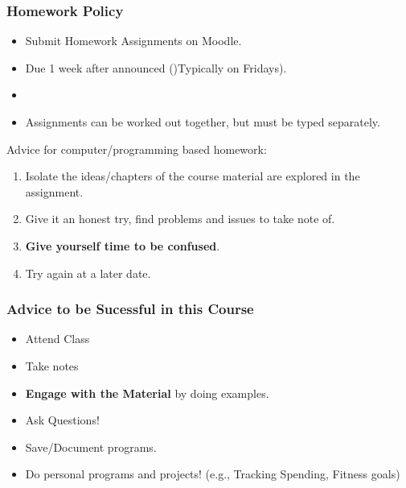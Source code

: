 \documentclass[17pt]{beamer}
\begin{document}
\begin{frame}
	\frametitle{Homework Policy}
	\begin{itemize}
		\item Submit Homework Assignments on Moodle.
		\item Due 1 week after announced ()Typically on Fridays). 
		\item \textbf{\color{red}{No Late Work is Accepted}}
		\item Assignments can be worked out together, but must be typed separately.
	\end{itemize}
\end{frame}
\begin{frame}
Advice for computer/programming based homework:
\begin{enumerate}
	\item Isolate the ideas/chapters of the course material are explored in the assignment.
	\item Give it an honest try, find problems and issues to take note of.
	\item \textbf{Give yourself time to be confused}. 
	\item Try again at a later date.  
\end{enumerate}
\end{frame}
\begin{frame}
	\frametitle{Advice to be Sucessful in this Course}
	\begin{itemize}
		\item Attend Class
		\item Take notes
		\item \textbf{Engage with the Material} by doing examples.
		\item Ask Questions!
		\item Save/Document programs.
		\item Do personal programs and projects! (e.g., Tracking Spending, Fitness goals)
	\end{itemize}
\end{frame}
\end{document}

